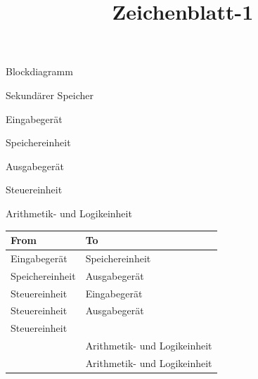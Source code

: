 \documentclass[11pt,a4paper]{article}
\title{Zeichenblatt-1}
\begin{document}
\maketitle

Blockdiagramm

Sekundärer
Speicher

Eingabegerät

Speichereinheit

Ausgabegerät

Steuereinheit

Arithmetik- und
Logikeinheit

\begin{table}[h]
\begin{tabular}{|l|l|}
\hline
From & To \\ \hline
Eingabegerät & Speichereinheit \\ \hline
Speichereinheit & Ausgabegerät \\ \hline
Steuereinheit & Eingabegerät \\ \hline
Steuereinheit & Ausgabegerät \\ \hline
Steuereinheit &  \\ \hline
 & Arithmetik- und Logikeinheit \\ \hline
 & Arithmetik- und Logikeinheit \\ \hline
\end{tabular}
\end{table}
\end{document}
